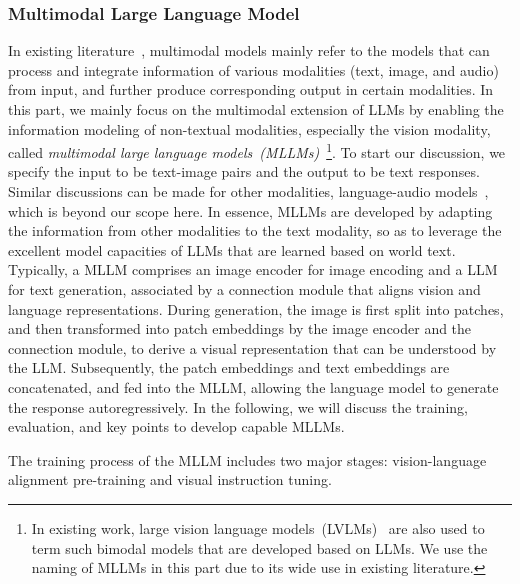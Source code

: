 {\subsubsection{Multimodal Large Language Model}\label{sec-MLLM}
{In existing literature~\cite{Du-arxiv-2023-survey,Gan-Foundation-2022-vision}, multimodal models mainly refer to the models that can process and integrate information of various  modalities (\eg text, image, and audio) from input, and further produce corresponding output in certain modalities. 
In this part, we mainly focus on the multimodal extension of LLMs by enabling the information modeling of non-textual modalities, especially the vision modality, called \emph{multimodal large language models~(MLLMs)}~\cite{Li-arXiv-2023-Multimodal}\footnote{In existing work, large vision language models~(LVLMs)~\cite{Li-arxiv-2023-Evaluating} are also used to term such bimodal models that are developed based on LLMs. We use the naming of MLLMs in this part due to its wide use in existing literature. }. 
To start our discussion, we specify the input to be text-image pairs and the output to be text responses. Similar discussions can be made for other modalities, \eg language-audio  models~\cite{Rubenstein-2023-arxiv-audiopalm}, which is beyond our scope here.  
In essence, MLLMs are developed by adapting the information from other modalities to the text modality, so as to leverage the excellent model capacities of LLMs that are learned based on world text. %
Typically, a MLLM comprises an image encoder for image encoding and a LLM for text generation, associated by a connection module that aligns vision and language representations. During generation, the image is first split into patches, and then transformed into patch embeddings by the image encoder and the connection module, to derive a visual representation that can be understood by the LLM. Subsequently, the patch embeddings and text embeddings are concatenated, and fed into the MLLM, allowing the language model to generate the response autoregressively. In the following, we will discuss the training, evaluation, and key points to develop capable MLLMs.}

{The training process of the MLLM includes two major stages: vision-language alignment pre-training and visual instruction tuning.} 

}
